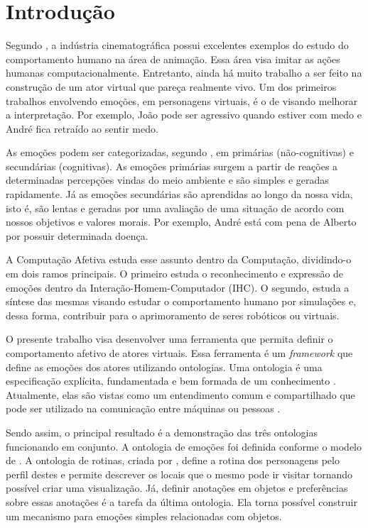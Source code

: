 \chapter{Introdução}

Segundo \citet{terzopoulos1998behavioral}, a indústria cinematográfica possui
excelentes exemplos do estudo do comportamento humano na área de animação.
Essa área visa imitar as ações humanas computacionalmente. Entretanto, ainda
há muito trabalho a ser feito na construção de um ator virtual que pareça
realmente vivo. Um dos primeiros trabalhos envolvendo emoções, em personagens
virtuais, é o de \citet{bates1994role} visando melhorar a interpretação. Por
exemplo, João pode ser agressivo quando estiver com medo e André fica retraído
ao sentir medo.

As emoções podem ser categorizadas, segundo \citet{damasio2004erro}, em
primárias (não-cognitivas) e secundárias (cognitivas). As emoções primárias
surgem a partir de reações a determinadas percepções vindas do meio ambiente e
são simples e geradas rapidamente. Já as emoções secundárias são aprendidas ao
longo da nossa vida, isto é, são lentas e geradas por uma avaliação de uma
situação de acordo com nossos objetivos e valores morais. Por exemplo, André
está com pena de Alberto por possuir determinada doença.

A Computação Afetiva estuda esse assunto dentro da Computação, dividindo-o em
dois ramos principais. O primeiro estuda o reconhecimento e expressão de
emoções dentro da Interação-Homem-Computador (IHC). O segundo, estuda a
síntese das mesmas visando estudar o comportamento humano por simulações e,
dessa forma, contribuir para o aprimoramento de seres robóticos ou virtuais.

O presente trabalho visa desenvolver uma ferramenta que permita definir o
comportamento afetivo de atores virtuais. Essa ferramenta é um
\emph{framework} que define as emoções dos atores utilizando ontologias. Uma
ontologia é uma especificação explícita, fundamentada e bem formada de um
conhecimento \cite{gruber1993translation}. Atualmente, elas são vistas como um
entendimento comum e compartilhado que pode ser utilizado na comunicação entre
máquinas ou pessoas \cite{wks2008towards}.

Sendo assim, o principal resultado é a demonstração das três ontologias
funcionando em conjunto. A ontologia de emoções foi definida conforme o modelo
de \citet{ortony1988cse}. A ontologia de rotinas, criada por
\citet{paiva2005ontology}, define a rotina dos personagens pelo perfil destes
e permite descrever os locais que o mesmo pode ir visitar tornando possível
criar uma visualização. Já, definir anotações em objetos e preferências sobre
essas anotações é a tarefa da última ontologia. Ela torna possível construir
um mecanismo para emoções simples relacionadas com objetos.

